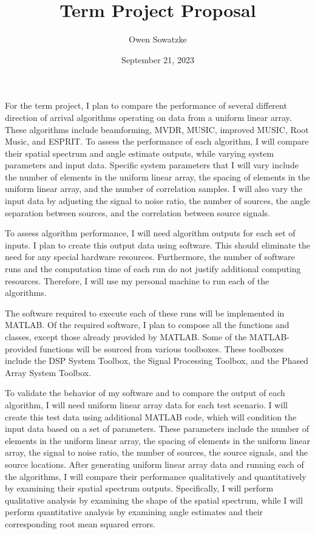 \documentclass{article}
\title{Term Project Proposal}
\author{Owen Sowatzke}
\date{September 21, 2023}
\begin{document}
	\maketitle

	For the term project, I plan to compare the performance of several different direction of arrival algorithms operating on data from a uniform linear array. These algorithms include beamforming, MVDR, MUSIC, improved MUSIC, Root Music, and ESPRIT. To assess the performance of each algorithm, I will compare their spatial spectrum and angle estimate outputs, while varying system parameters and input data. Specific system parameters that I will vary include the number of elements in the uniform linear array, the spacing of elements in the uniform linear array, and the number of correlation samples. I will also vary the input data by adjusting the signal to noise ratio, the number of sources, the angle separation between sources, and the correlation between source signals.
	
	To assess algorithm performance, I will need algorithm outputs for each set of inputs. I plan to create this output data using software. This should eliminate the need for any special hardware resources. Furthermore, the number of software runs and the computation time of each run do not justify additional computing resources. Therefore, I will use my personal machine to run each of the algorithms.
	
	The software required to execute each of these runs will be implemented in MATLAB. Of the required software, I plan to compose all the functions and classes, except those already provided by MATLAB. Some of the MATLAB-provided functions will be sourced from various toolboxes. These toolboxes include the DSP System Toolbox, the Signal Processing Toolbox, and the Phased Array System Toolbox.
	
	To validate the behavior of my software and to compare the output of each algorithm, I will need uniform linear array data for each test scenario. I will create this test data using additional MATLAB code, which will condition the input data based on a set of parameters. These parameters include the number of elements in the uniform linear array, the spacing of elements in the uniform linear array, the signal to noise ratio, the number of sources, the source signals, and the source locations. After generating uniform linear array data and running each of the algorithms, I will compare their performance qualitatively and quantitatively by examining their spatial spectrum outputs. Specifically, I will perform qualitative analysis by examining the shape of the spatial spectrum, while I will perform quantitative analysis by examining angle estimates and their corresponding root mean squared errors.
	
	\nocite{doa_algorithms_raghu}
	\nocite{mvdr_montlouis}
	\nocite{capon_sanudin}
	\nocite{music_chowdhury}
	\nocite{improved_music_gupta}
	\nocite{root_music_esprit_patwari}
	\nocite{esprit_ning}
	\newpage
	{}
	
\end{document}
